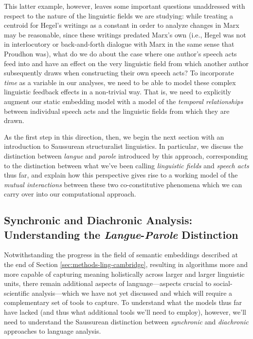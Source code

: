 \documentclass[11pt]{article}
\newcommand{\dett}[1]{\texttt{#1}}
\begin{document}
This latter example, however, leaves some important questions unaddressed with respect to the nature of the linguistic fields we are studying: while treating a centroid for Hegel's writings as a constant in order to analyze changes in Marx may be reasonable, since these writings predated Marx's own (i.e., Hegel was not in interlocutory or back-and-forth dialogue with Marx in the same sense that Proudhon was), what do we do about the case where one author's speech acts feed into and have an effect on the very linguistic field from which another author subsequently draws when constructing their own speech acts? To incorporate \textit{time} as a variable in our analyses, we need to be able to model these complex linguistic feedback effects in a non-trivial way. That is, we need to explicitly augment our static embedding model with a model of the \textit{temporal relationships} between individual speech acts and the linguistic fields from which they are drawn.

As the first step in this direction, then, we begin the next section with an introduction to Saussurean structuralist linguistics. In particular, we discuss the distinction between \textit{langue} and \textit{parole} introduced by this approach, corresponding to the distinction between what we've been calling \textit{linguistic fields} and \textit{speech acts} thus far, and explain how this perspective gives rise to a working model of the \textit{mutual interactions} between these two co-constitutive phenomena which we can carry over into our computational approach.




\subsection{Synchronic and Diachronic Analysis: Understanding the \textit{Langue}-\textit{Parole} Distinction}\label{sec:methods-diachronic}

Notwithstanding the progress in the field of semantic embeddings described at the end of Section \ref{sec:methods-ling-cambridge}, resulting in algorithms more and more capable of capturing meaning holistically across larger and larger linguistic units, there remain additional aspects of language---aspects crucial to social-scientific analysis---which we have not yet discussed and which will require a complementary set of tools to capture. To understand what the models thus far have lacked (and thus what additional tools we'll need to employ), however, we'll need to understand the Saussurean distinction between \textit{synchronic} and \textit{diachronic} approaches to language analysis.
\end{document}
